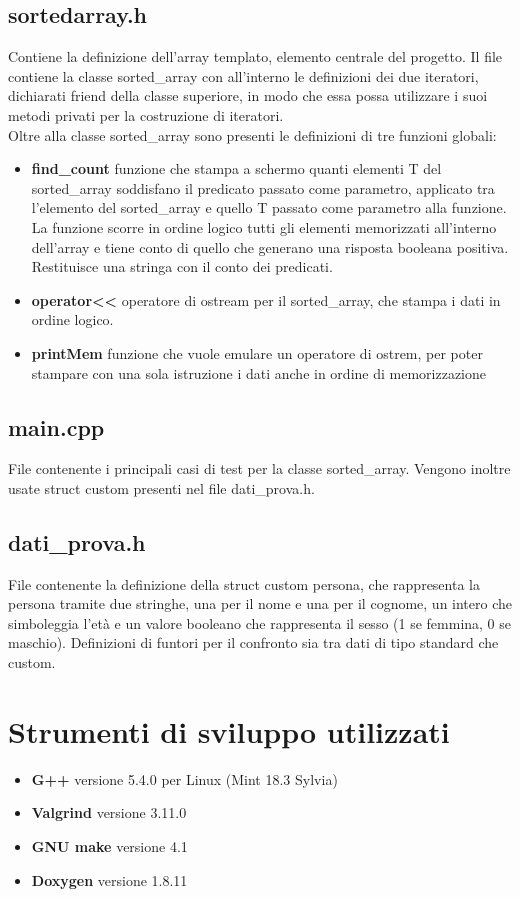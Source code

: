 \documentclass[11pt]{article}
\begin{document}
\subsection*{sortedarray.h}
Contiene la definizione dell'array templato, elemento centrale del progetto. Il file contiene la classe 
sorted\_array con all'interno le definizioni dei due iteratori, dichiarati friend della classe superiore, in 
modo che essa possa utilizzare i suoi metodi privati per la costruzione di iteratori.\\
Oltre alla classe sorted\_array sono presenti le definizioni di tre funzioni globali:
\begin{itemize}
\item \textbf{find\_count} funzione che stampa a schermo quanti elementi T del sorted\_array soddisfano il predicato 
passato come parametro, applicato tra l'elemento del sorted\_array e quello T passato come parametro alla funzione. 
La funzione scorre in ordine logico tutti gli elementi memorizzati all'interno dell'array e tiene conto di quello che generano una risposta booleana positiva. Restituisce una stringa con il conto dei predicati.
\item \textbf{operator<<} operatore di ostream per il sorted\_array, che stampa i dati in ordine logico.
\item \textbf{printMem} funzione che vuole emulare un operatore di ostrem, per poter stampare con una sola istruzione 
i dati anche in ordine di memorizzazione
\end{itemize}
\subsection*{main.cpp}
File contenente i principali casi di test per la classe sorted\_array. Vengono inoltre usate struct custom presenti nel file dati\_prova.h.
\subsection*{dati\_prova.h}
File contenente la definizione della struct custom persona, che rappresenta la persona tramite due stringhe, una per 
il nome e una per il cognome, un intero che simboleggia l'età e un valore booleano che rappresenta il sesso 
(1 se femmina, 0 se maschio). Definizioni di funtori per il confronto sia tra dati di tipo standard che custom.
\section*{Strumenti di sviluppo utilizzati}
\begin{itemize}
\item \textbf{G++} versione 5.4.0 per Linux (Mint 18.3 Sylvia)
\item \textbf{Valgrind} versione 3.11.0
\item \textbf{GNU make} versione 4.1
\item \textbf{Doxygen} versione 1.8.11
\end{itemize} 
\end{document}
